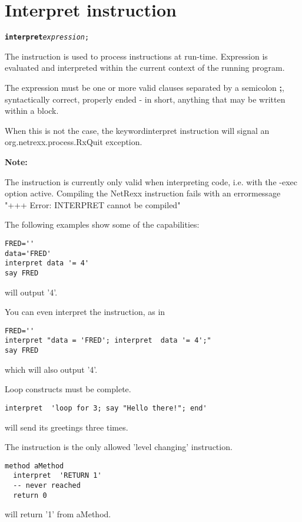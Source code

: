 \section{Interpret instruction}\label{refinterpret}
\index{}
\index{,}
\index{,}
\begin{shaded}
\begin{alltt}
\textbf{interpret} \emph{expression};

\end{alltt}
\end{shaded}

The  instruction is used to process instructions at run-time.
Expression is evaluated and interpreted within the current context of the running program.

The expression must be one or more valid clauses separated by a semicolon \textbf{;}, syntactically correct, properly ended - in short,
anything that may be written within a  block.

When this is not the case, the keyword{interpret} instruction will signal an
org.netrexx.process.RxQuit exception.


\begin{shaded}
\textbf{Note:}

The  instruction is currently only valid when interpreting code, i.e. with the -exec option active.\newline
Compiling the NetRexx  instruction fails with an errormessage "+++ Error: INTERPRET cannot be compiled"
\end{shaded}

The following examples show some of the capabilities:

\begin{lstlisting}
FRED=''
data='FRED'
interpret data '= 4'
say FRED
\end{lstlisting}
will output '4'.

You can even interpret the  instruction, as in

\begin{lstlisting}
FRED=''
interpret "data = 'FRED'; interpret  data '= 4';"
say FRED
\end{lstlisting}
which will also output '4'.

Loop constructs must be complete.

\begin{lstlisting}
interpret  'loop for 3; say "Hello there!"; end'
\end{lstlisting}
will send its greetings three times.

The  instruction is the only allowed 'level changing' instruction.

\begin{lstlisting}
method aMethod
  interpret  'RETURN 1'
  -- never reached
  return 0
\end{lstlisting}
will return '1' from aMethod.


